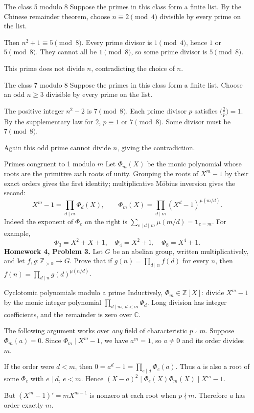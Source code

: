 \documentclass[aspectratio=169,11pt]{beamer}
\newcommand{\Z}{\mathbb Z}
\newcommand{\C}{\mathbb C}
\newcommand{\ind}{\mathbf1}
\newcommand{\HW}[2]{{\color{teal}\textbf{Homework #1, Problem #2.}}}
\begin{document}
\begin{frame}{The class 5 modulo 8}
Suppose the primes in this class form a finite list. By the Chinese remainder theorem, choose $n\equiv2\pmod4$ divisible by every prime on the list.

Then $n^2+1\equiv5\pmod8$. Every prime divisor is $1\pmod4$, hence $1$ or $5\pmod8$. They cannot all be $1\pmod8$, so some prime divisor is $5\pmod8$.

This prime does not divide $n$, contradicting the choice of $n$.
\end{frame}
\begin{frame}{The class 7 modulo 8}
Suppose the primes in this class form a finite list. Choose an odd $n\ge3$ divisible by every prime on the list.

The positive integer $n^2-2$ is $7\pmod8$. Each prime divisor $p$ satisfies $\bigl(\frac2p\bigr)=1$. By the supplementary law for $2$, $p\equiv1$ or $7\pmod8$. Some divisor must be $7\pmod8$.

Again this odd prime cannot divide $n$, giving the contradiction.
\end{frame}
\begin{frame}{Primes congruent to 1 modulo $m$}
\small
Let $\Phi_m(X)$ be the monic polynomial whose roots are the primitive $m$th roots of unity. Grouping the roots of $X^m-1$ by their exact orders gives the first identity; multiplicative M\"obius inversion gives the second:
\[X^m-1=\prod_{d\mid m}\Phi_d(X),\qquad \Phi_m(X)=\prod_{d\mid m}(X^d-1)^{\mu(m/d)}.\]
Indeed the exponent of $\Phi_e$ on the right is $\sum_{e\mid d\mid m}\mu(m/d)=\ind_{e=m}$. For example,
\[\Phi_3=X^2+X+1,\quad\Phi_4=X^2+1,\quad\Phi_8=X^4+1.\]
\HW{4}{3} Let $G$ be an abelian group, written multiplicatively, and let $f,g:\Z_{>0}\to G$. Prove that if $g(n)=\prod_{d\mid n}f(d)$ for every $n$, then $f(n)=\prod_{d\mid n}g(d)^{\mu(n/d)}$.
\end{frame}
\begin{frame}{Cyclotomic polynomials modulo a prime}
Inductively, $\Phi_m\in\Z[X]$: divide $X^m-1$ by the monic integer polynomial $\prod_{d\mid m,\ d<m}\Phi_d$. Long division has integer coefficients, and the remainder is zero over $\C$.

The following argument works over \emph{any} field of characteristic $p\nmid m$. Suppose $\Phi_m(a)=0$. Since $\Phi_m\mid X^m-1$, we have $a^m=1$, so $a\ne0$ and its order divides $m$.

If the order were $d<m$, then $0=a^d-1=\prod_{e\mid d}\Phi_e(a)$. Thus $a$ is also a root of some $\Phi_e$ with $e\mid d$, $e<m$. Hence $(X-a)^2\mid\Phi_e(X)\Phi_m(X)\mid X^m-1$.

But $(X^m-1)'=mX^{m-1}$ is nonzero at each root when $p\nmid m$. Therefore $a$ has order exactly $m$.
\end{frame}
\end{document}
